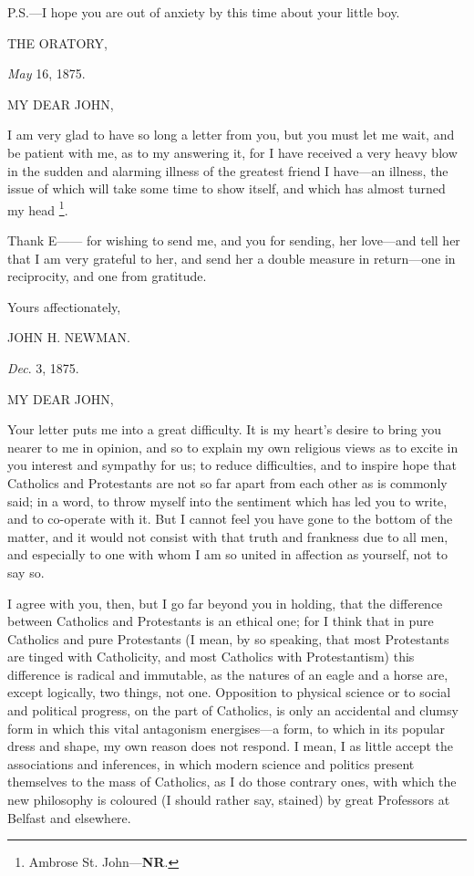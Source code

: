 P.S.—I hope you are out of anxiety by this time
about your little boy.

THE ORATORY,

\emph{May} 16, 1875.

MY DEAR
JOHN,

I am very glad to have so long a letter from you, but you must let me
wait, and be patient with me, as to my answering it, for I have
received a very heavy blow in the sudden and alarming illness of the
greatest friend I have—an illness, the issue of which will take some
time to show itself, and which has almost turned my head \footnote{Ambrose St. John—\textbf{NR}.}.

Thank E—— for wishing to send me, and you for
sending, her love—and tell her that I am very grateful to her, and
send her a double measure in return—one in reciprocity, and one from
gratitude.

Yours affectionately,

JOHN H. NEWMAN.

\emph{Dec}. 3, 1875.

MY DEAR
JOHN,

Your letter puts me into a great difficulty. It is my heart's desire
to bring you nearer to me in opinion, and so to explain my own
religious views as to excite in you interest and sympathy for us; to
reduce difficulties, and to inspire hope that Catholics and
Protestants are not so far apart from each other as is commonly said;
in a word, to throw myself into the sentiment which has led you to
write, and to co-operate with it. But I cannot feel you have gone to
the bottom of the matter, and it would not consist with that truth and
frankness due to all men, and especially to one with whom I am so
united in affection as yourself, not to say so.

I agree with you, then, but I go far beyond you
in holding, that the difference between Catholics and Protestants is
an ethical one; for I think that in pure Catholics and pure
Protestants (I mean, by so speaking, that most Protestants are tinged
with Catholicity, and most Catholics with Protestantism) this
difference is radical and immutable, as the natures of an eagle and a
horse are, except logically, two things, not one. Opposition to
physical science or to social and political progress, on the part of
Catholics, is only an accidental and clumsy form in which this vital
antagonism energises—a form, to which in its popular dress and
shape, my own reason does not respond. I mean, I as little accept the
associations and inferences, in which modern science and politics
present themselves to the mass of Catholics, as I do those contrary
ones, with which the new philosophy is coloured (I should rather say,
stained) by great Professors at Belfast and elsewhere.

